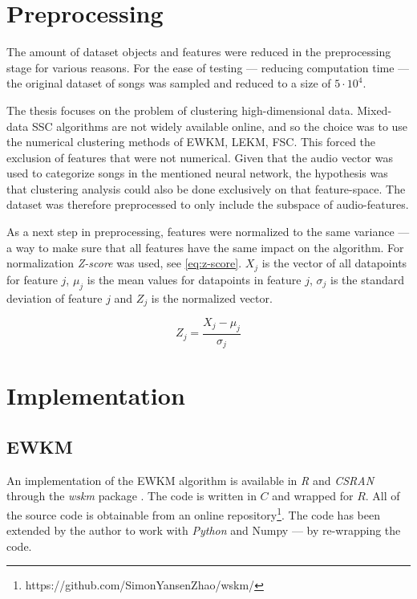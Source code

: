 \documentclass[../report.tex]{subfiles}
\begin{document}
\section{Preprocessing}
The amount of dataset objects and features were reduced in the preprocessing stage for various reasons. For the ease of testing --- reducing computation time --- the original dataset of songs was sampled and reduced to a size of $5 \cdot 10^4$.

The thesis focuses on the problem of clustering high-dimensional data. Mixed-data SSC algorithms are not widely available online, and so the choice was to use the numerical clustering methods of EWKM, LEKM, FSC. This forced the exclusion of features that were not numerical. Given that the audio vector was used to categorize songs in the mentioned neural network, the hypothesis was that clustering analysis could also be done exclusively on that feature-space. The dataset was therefore preprocessed to only include the subspace of audio-features.

As a next step in preprocessing, features were normalized to the same variance --- a way to make sure that all features have the same impact on the algorithm. For normalization \textit{Z-score} was used, see \cref{eq:z-score}. $X_j$ is the vector of all datapoints for feature $j$, $\mu_j$ is the mean values for datapoints in feature $j$, $\sigma_{j}$ is the standard deviation of feature $j$ and $Z_j$ is the normalized vector.

\begin{equation}
  \label{eq:z-score}
  Z_j = \frac{X_j - \mu_j}{\sigma_j}
\end{equation}

\section{Implementation}

\subsection{EWKM}
An implementation of the EWKM algorithm is available in \textit{R} and \textit{CSRAN} through the \textit{wskm} package \cite{wskm2014hz}. The code is written in $C$ and wrapped for $R$. All of the source code is obtainable from an online repository\footnote{https://github.com/SimonYansenZhao/wskm/}. The code has been extended by the author to work with \textit{Python} and Numpy\cite{numpy-c} --- by re-wrapping the code.
\end{document}
